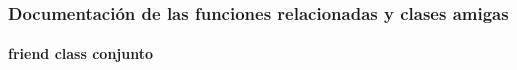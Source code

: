 \subsubsection{Documentación de las funciones relacionadas y clases amigas}
\hypertarget{classconjunto_1_1const__description__iterator_a42fdcda39c77eabd7380e29fcdbe5dd2}{
\paragraph[{conjunto}]{\setlength{\rightskip}{0pt plus 5cm}friend class {\bf conjunto}\hspace{0.3cm}{\ttfamily [friend]}}}\label{classconjunto_1_1const__description__iterator_a42fdcda39c77eabd7380e29fcdbe5dd2}


